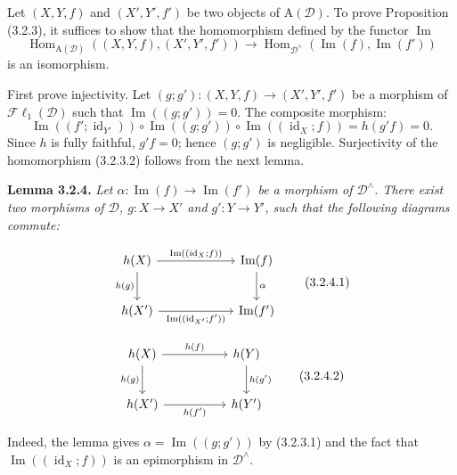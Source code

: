 \clearpage
{}%
\begingroup\small
\setlength{\parskip}{0pt}\setlength{\emergencystretch}{1.5em}

Let $(X,Y,f)$ and $(X',Y',f')$ be two objects of $\mathrm A(\mathcal D)$.
To prove Proposition (3.2.3), it suffices to show that the homomorphism
defined by the functor $\operatorname{Im}$
\[
\operatorname{Hom}_{\mathrm A(\mathcal D)}((X,Y,f),(X',Y',f'))
\longrightarrow
\operatorname{Hom}_{\mathcal D^\wedge}(\operatorname{Im}(f),\operatorname{Im}(f'))
\tag{3.2.3.2}
\]
is an isomorphism.

First prove injectivity. Let
$(g;g')\colon(X,Y,f)\to(X',Y',f')$ be a morphism of
$\mathcal{F}\ell_1(\mathcal D)$ such that
$\operatorname{Im}((g;g'))=0$. The composite morphism:
\[
\operatorname{Im}((f';\operatorname{id}_{Y'}))\circ
\operatorname{Im}((g;g'))\circ
\operatorname{Im}((\operatorname{id}_X;f))=h(g'f)=0.
\]
Since $h$ is fully faithful, $g'f=0$; hence $(g;g')$ is negligible.
Surjectivity of the homomorphism (3.2.3.2) follows from the next lemma.

\medskip\noindent\textbf{Lemma 3.2.4.}\quad
\textit{Let
$\alpha\colon\operatorname{Im}(f)\to\operatorname{Im}(f')$ be a morphism of
$\mathcal D^\wedge$. There exist two morphisms of $\mathcal D$,
$g\colon X\to X'$ and $g'\colon Y\to Y'$, such that the following diagrams
commute:}

\[
\begin{tikzcd}[column sep=6em,row sep=2.3em]
h(X)\arrow[r,"\operatorname{Im}((\operatorname{id}_X;f))"]\arrow[d,"h(g)"']&
\operatorname{Im}(f)\arrow[d,"\alpha"]\\
h(X')\arrow[r,"\operatorname{Im}((\operatorname{id}_{X'};f'))"']&
\operatorname{Im}(f')
\end{tikzcd}
\tag{3.2.4.1}
\]

\[
\begin{tikzcd}[column sep=5em,row sep=2.3em]
h(X)\arrow[r,"h(f)"]\arrow[d,"h(g)"']&h(Y)\arrow[d,"h(g')"]\\
h(X')\arrow[r,"h(f')"']&h(Y')
\end{tikzcd}
\tag{3.2.4.2}
\]

Indeed, the lemma gives $\alpha=\operatorname{Im}((g;g'))$ by (3.2.3.1)
and the fact that $\operatorname{Im}((\operatorname{id}_X;f))$ is an
epimorphism in $\mathcal D^\wedge$.
\endgroup

